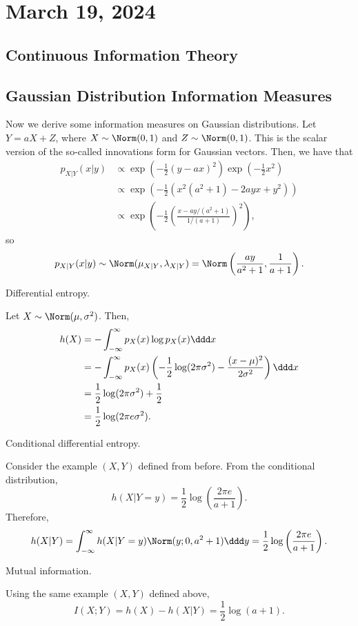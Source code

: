 \section{March 19, 2024}

\subsection{Continuous Information Theory}

\subsection{Gaussian Distribution Information Measures}

Now we derive some information measures on Gaussian distributions. Let $Y = aX + Z$, where $X\sim \Norm(0,1)$ and $Z\sim \Norm(0,1)$. This is the scalar version of the so-called \ac{innovations form} for Gaussian vectors. Then, we have that 
\begin{align*}
	p_{X|Y}(x|y) &\propto \exp \left(-\frac{1}{2}(y-ax)^2\right)\exp \left(-\frac{1}{2}x^2\right) \\
							 &\propto \exp \left(-\frac{1}{2} \left(x^2(a^2+1) - 2ayx + y^2\right)\right) \\
							 &\propto \exp \left(-\frac{1}{2} \left(\frac{x - ay/(a^2+1)}{1/(a+1)}\right)^2\right),
\end{align*}
so 
\[p_{X|Y}(x|y) \sim \Norm(\mu_{X|Y}, \lambda_{X|Y}) = \Norm\left(\frac{ay}{a^2+1}, \frac{1}{a+1}\right).\] 

\begin{example}
\exlabel

Differential entropy.
\end{example}

Let $X\sim \Norm(\mu, \sigma^2)$. Then,
\begin{align*}
	h(X) &= -\int_{-\infty}^{\infty}p_X(x)\log p_X(x) \ddd x\\
			 &= -\int_{-\infty}^{\infty}p_X(x)\left(-\frac{1}{2}\log(2\pi\sigma^2)-\frac{(x-\mu)^2}{2\sigma^2}\right)\ddd x \\
			 &= \frac{1}{2}\log(2\pi\sigma^2) + \frac{1}{2} \\
			 &= \frac{1}{2}\log(2\pi e\sigma^2).
\end{align*}

\begin{example}
\exlabel

Conditional differential entropy.
\end{example}

\noindent Consider the example $(X,Y)$ defined from before. From the conditional distribution, 
\[h(X|Y=y) = \frac{1}{2}\log\left(\frac{2\pi e}{a+1}\right).\] 
Therefore, 
\[h(X|Y) = \int_{-\infty}^{\infty}h(X|Y=y)\Norm(y;0,a^2+1)\ddd y = \frac{1}{2} \log \left(\frac{2\pi e}{a+1}\right).\] 

\begin{example}
\exlabel

Mutual information.
\end{example}

\noindent Using the same example $(X,Y)$ defined above,
\[I(X;Y) = h(X) - h(X|Y) = \frac{1}{2}\log(a+1).\] 
